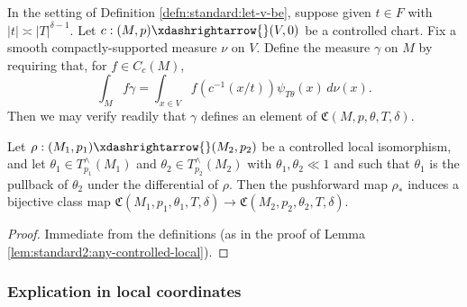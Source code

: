 \begin{example}\label{example:standard2:smooth-modulated-bump-in-frak-C}
  In the setting of Definition \ref{defn:standard:let-v-be}, suppose given $t \in F$ with $|t| \asymp |T|^{\delta-1}$.  Let $c : (M, p ) \xdashrightarrow{} (V,0)$ be a controlled chart.  Fix a smooth compactly-supported measure $\nu$ on $V$.  Define the measure $\gamma$ on $M$ by requiring that, for $f \in C_c(M)$,
  \begin{equation*}
    \int_M f \gamma
    = \int_{x \in V}
    f(c^{-1}(x/t))
    \psi_{T \theta}(x)
    \, d \nu(x).
  \end{equation*}
  Then we may verify readily that $\gamma$ defines an element of $\mathfrak{C}(M,p,\theta,T,\delta)$.
\end{example}

\begin{lemma}\label{lem:if-rho-local}
  Let $\rho : (M_1, p_1) \xdashrightarrow{} (M_2,p_2)$ be a controlled local isomorphism, and let $\theta_1 \in T_{p_1}^\wedge(M_1)$ and $\theta_2 \in T_{p_2}^\wedge(M_2)$ with $\theta_1, \theta_2 \ll 1$ and such that $\theta_1$ is the pullback of $\theta_2$ under the differential of $\rho$.  Then the pushforward map $\rho_*$ induces a bijective class map $\mathfrak{C}(M_1,p_1,\theta_1,T,\delta) \rightarrow \mathfrak{C}(M_2,p_2,\theta_2,T,\delta)$.
\end{lemma}
\begin{proof}
  Immediate from the definitions (as in the proof of Lemma \ref{lem:standard2:any-controlled-local}).
\end{proof}

\subsubsection{Explication in local coordinates}


